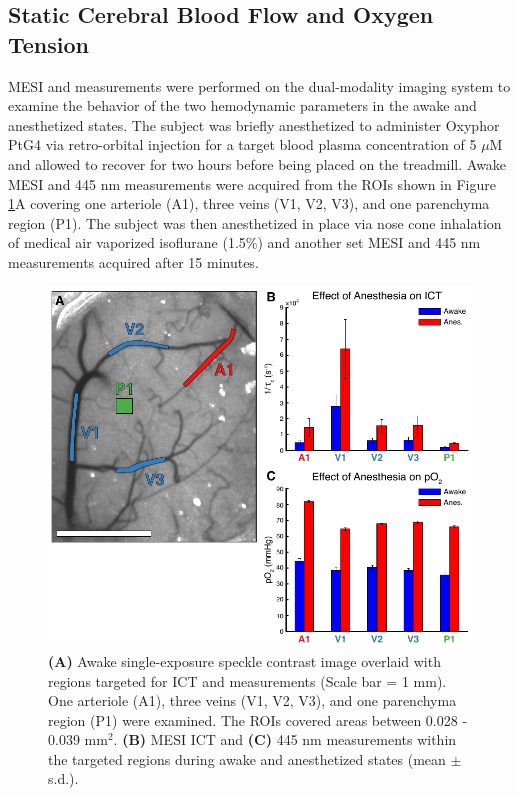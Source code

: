 \subsection{Static Cerebral Blood Flow and Oxygen Tension}

MESI and  measurements were performed on the dual-modality imaging system to examine the behavior of the two hemodynamic parameters in the awake and anesthetized states. The subject was briefly anesthetized to administer Oxyphor PtG4 via retro-orbital injection for a target blood plasma concentration of 5 $\mu$M and allowed to recover for two hours before being placed on the treadmill. Awake MESI and 445 nm  measurements were acquired from the ROIs shown in Figure \ref{fig:specklepO2awakeanes}A covering one arteriole (A1), three veins (V1, V2, V3), and one parenchyma region (P1). The subject was then anesthetized in place via nose cone inhalation of medical air vaporized isoflurane (1.5\%) and another set MESI and 445 nm  measurements acquired after 15 minutes.

\begin{figure}
    \includegraphics{figures/chapter_5/specklepO2awakeanes.pdf}
    \caption{
        \label{fig:specklepO2awakeanes}
        \textbf{(A)} Awake single-exposure speckle contrast image overlaid with regions targeted for ICT and  measurements (Scale bar = 1 mm). One arteriole (A1), three veins (V1, V2, V3), and one parenchyma region (P1) were examined. The ROIs covered areas between 0.028 - 0.039 mm$^2$. \textbf{(B)} MESI ICT and \textbf{(C)} 445 nm  measurements within the targeted regions during awake and anesthetized states (mean $\pm$ s.d.).
    }
\end{figure}

